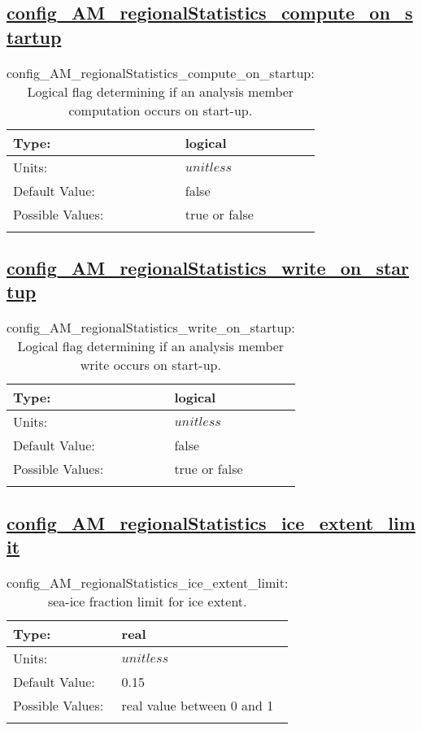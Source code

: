 \subsection[config\_AM\_regionalStatistics\_compute\_on\_startup]{\hyperref[sec:nm_tab_AM_regionalStatistics]{config\_AM\_regionalStatistics\_compute\_on\_startup}}
\label{subsec:nm_sec_config_AM_regionalStatistics_compute_on_startup}
\begin{center}
\begin{longtable}{| p{2.0in} || p{4.0in} |}
    \hline
    Type: & logical \\
    \hline
    Units: & $unitless$ \\
    \hline
    Default Value: & false \\
    \hline
    Possible Values: & true or false \\
    \hline
    \caption{config\_AM\_regionalStatistics\_compute\_on\_startup: Logical flag determining if an analysis member computation occurs on start-up.}
\end{longtable}
\end{center}
\subsection[config\_AM\_regionalStatistics\_write\_on\_startup]{\hyperref[sec:nm_tab_AM_regionalStatistics]{config\_AM\_regionalStatistics\_write\_on\_startup}}
\label{subsec:nm_sec_config_AM_regionalStatistics_write_on_startup}
\begin{center}
\begin{longtable}{| p{2.0in} || p{4.0in} |}
    \hline
    Type: & logical \\
    \hline
    Units: & $unitless$ \\
    \hline
    Default Value: & false \\
    \hline
    Possible Values: & true or false \\
    \hline
    \caption{config\_AM\_regionalStatistics\_write\_on\_startup: Logical flag determining if an analysis member write occurs on start-up.}
\end{longtable}
\end{center}
\subsection[config\_AM\_regionalStatistics\_ice\_extent\_limit]{\hyperref[sec:nm_tab_AM_regionalStatistics]{config\_AM\_regionalStatistics\_ice\_extent\_limit}}
\label{subsec:nm_sec_config_AM_regionalStatistics_ice_extent_limit}
\begin{center}
\begin{longtable}{| p{2.0in} || p{4.0in} |}
    \hline
    Type: & real \\
    \hline
    Units: & $unitless$ \\
    \hline
    Default Value: & 0.15 \\
    \hline
    Possible Values: & real value between 0 and 1 \\
    \hline
    \caption{config\_AM\_regionalStatistics\_ice\_extent\_limit: sea-ice fraction limit for ice extent.}
\end{longtable}
\end{center}

